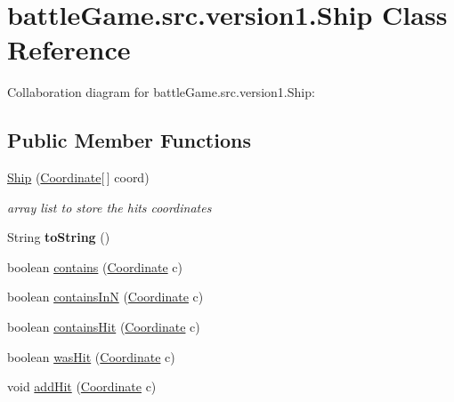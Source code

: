 \hypertarget{classbattleGame_1_1src_1_1version1_1_1Ship}{}\section{battle\+Game.\+src.\+version1.\+Ship Class Reference}
\label{classbattleGame_1_1src_1_1version1_1_1Ship}


Collaboration diagram for battle\+Game.\+src.\+version1.\+Ship\+:
\subsection*{Public Member Functions}
\begin{DoxyCompactItemize}
\item 
\hyperlink{classbattleGame_1_1src_1_1version1_1_1Ship_ae54b5f34a19ad5f9129cf99f2ce68ef7}{Ship} (\hyperlink{classbattleGame_1_1src_1_1version1_1_1Coordinate}{Coordinate}\mbox{[}$\,$\mbox{]} coord)
\begin{DoxyCompactList}\small\item\em array list to store the hits coordinates \end{DoxyCompactList}\item 
String {\bfseries to\+String} ()\hypertarget{classbattleGame_1_1src_1_1version1_1_1Ship_a2a7ae292701a4b993291a80bd06dd91b}{}\label{classbattleGame_1_1src_1_1version1_1_1Ship_a2a7ae292701a4b993291a80bd06dd91b}

\item 
boolean \hyperlink{classbattleGame_1_1src_1_1version1_1_1Ship_a21254082135d4ea23b7523e1a409fcb6}{contains} (\hyperlink{classbattleGame_1_1src_1_1version1_1_1Coordinate}{Coordinate} c)
\item 
boolean \hyperlink{classbattleGame_1_1src_1_1version1_1_1Ship_a4f7f079b12cdd3dd02cbcb03784d77eb}{contains\+InN} (\hyperlink{classbattleGame_1_1src_1_1version1_1_1Coordinate}{Coordinate} c)
\item 
boolean \hyperlink{classbattleGame_1_1src_1_1version1_1_1Ship_a17087769a4e73de10dcb74d5980c3e51}{contains\+Hit} (\hyperlink{classbattleGame_1_1src_1_1version1_1_1Coordinate}{Coordinate} c)
\item 
boolean \hyperlink{classbattleGame_1_1src_1_1version1_1_1Ship_aacaa85f0c9b950d1049eda5ec4690538}{was\+Hit} (\hyperlink{classbattleGame_1_1src_1_1version1_1_1Coordinate}{Coordinate} c)
\item 
void \hyperlink{classbattleGame_1_1src_1_1version1_1_1Ship_a20db117259bc8c4cc9e9d1fafee86da8}{add\+Hit} (\hyperlink{classbattleGame_1_1src_1_1version1_1_1Coordinate}{Coordinate} c)
\end{DoxyCompactItemize}


